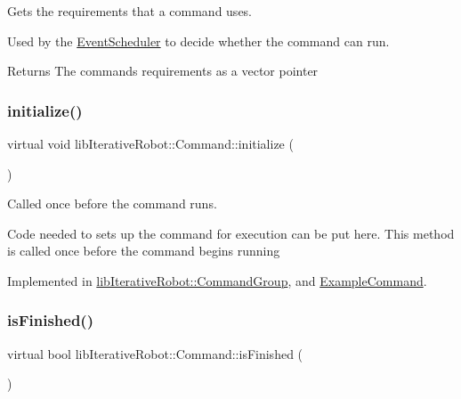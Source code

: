 Gets the requirements that a command uses. 

Used by the \mbox{\hyperlink{classlib_iterative_robot_1_1_event_scheduler}{Event\+Scheduler}} to decide whether the command can run. \begin{DoxyReturn}{Returns}
The command\textquotesingle{}s requirements as a vector pointer 
\end{DoxyReturn}
\mbox{\label{classlib_iterative_robot_1_1_command_a14543c9d38b07e52f9ffb2af88a63f60}} 
\subsubsection{\texorpdfstring{initialize()}{initialize()}}
{\footnotesize\ttfamily virtual void lib\+Iterative\+Robot\+::\+Command\+::initialize (\begin{DoxyParamCaption}{ }\end{DoxyParamCaption})\hspace{0.3cm}{\ttfamily [pure virtual]}}



Called once before the command runs. 

Code needed to sets up the command for execution can be put here. This method is called once before the command begins running 

Implemented in \mbox{\hyperlink{classlib_iterative_robot_1_1_command_group_a99800c5dbd05ab750aa0bb27518d0467}{lib\+Iterative\+Robot\+::\+Command\+Group}}, and \mbox{\hyperlink{class_example_command_ae7bea17127c1697acbf90d6022eb5b5d}{Example\+Command}}.

\mbox{\label{classlib_iterative_robot_1_1_command_a8e4dccdd88f432a716090f532ba097f7}} 
\subsubsection{\texorpdfstring{isFinished()}{isFinished()}}
{\footnotesize\ttfamily virtual bool lib\+Iterative\+Robot\+::\+Command\+::is\+Finished (\begin{DoxyParamCaption}{ }\end{DoxyParamCaption})\hspace{0.3cm}{\ttfamily [pure virtual]}}



